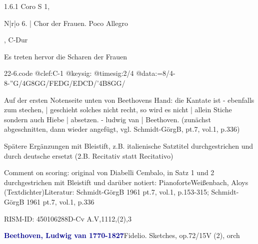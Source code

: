\documentclass[a4paper, twocolumn, 11pt]{book}
\begin{document}
\newline %
\par 1.6.1  Coro S 1, \begin{itshape}N|r|o 6. | Chor der Frauen. Poco Allegro\end{itshape}, C-Dur\newline \begin{footnotesize} Es treten hervor die Scharen der Frauen \end{footnotesize}  
\begin{filecontents*}{22-6.code}
@clef:C-1
@keysig:
@timesig:2/4
@data:=8/4-8-''G/4G8GG/{FE}{DG}/{ED}CD/'4B8GG/
\end{filecontents*}
\newline %
\par Auf der ersten Notenseite unten von Beethovens Hand: {\textquotedbl}die Kantate ist - ebenfalls zum stechen, | geschieht solches nicht recht, so wird es nicht | allein Stiche sondern auch Hiebe | absetzen. - ludwig van | Beethoven.{\textquotedbl} (zunächst abgeschnitten, dann wieder angefügt, vgl. Schmidt-GörgB, pt.7, vol.1, p.336)
\par Spätere Ergänzungen mit Bleistift, z.B. italienische Satztitel durchgestrichen und durch deutsche ersetzt (2.B. {\textquotedbl}Recitativ{\textquotedbl} statt {\textquotedbl}Recitativo{\textquotedbl})
\par Comment on scoring: original von Diabelli {\textquotedbl}Cembalo{\textquotedbl}, in Satz 1 und 2 durchgestrichen mit Bleistift und darüber notiert: {\textquotedbl}Pianoforte{\textquotedbl}\newline Weißenbach, Aloys  (Textdichter)\newline Literatur: Schmidt-GörgB 1961  pt.7, vol.1, p.153-315; Schmidt-GörgB 1961  pt.7, vol.1, p.336
\par RISM-ID: 450106288\newline D-Cv  A.V,1112,(2),3
\par \vspace{16pt} \textcolor{darkblue}{\textbf{Beethoven, Ludwig van  1770-1827}}\hfillplus{[23]}\newline Fidelio. Sketches, op.72/15\newline V (2), orch
\end{document}
